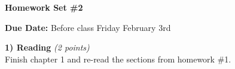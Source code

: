 

\def\xyprime{\ensuremath{\begin{pmatrix} x' \\ y' \end{pmatrix}}}



\thispagestyle{fancy}






\begin{center}
{\huge \textbf{Homework Set \#2}}
\large

{\textbf{ Due Date:} Before class Friday February 3rd  }
\end{center}

\textbf{1) Reading } \hfill \textit{(2 points)}\\
Finish chapter 1 and re-read the sections from homework \#1.

\vspace*{0.25in}



